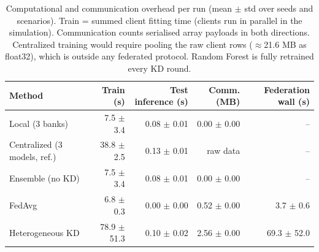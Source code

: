 \begin{table}[t]
\centering
\scriptsize
\caption{Computational and communication overhead per run (mean $\pm$ std over seeds and scenarios). Train = summed client fitting time (clients run in parallel in the simulation). Communication counts serialised array payloads in both directions. Centralized training would require pooling the raw client rows ($\approx$21.6 MB as float32), which is outside any federated protocol. Random Forest is fully retrained every KD round.}
\label{tab:cost}
\begin{tabular}{lrrrr}
\toprule
Method & Train (s) & Test inference (s) & Comm. (MB) & Federation wall (s) \\
\midrule
Local (3 banks) & 7.5 $\pm$ 3.4 & 0.08 $\pm$ 0.01 & 0.00 $\pm$ 0.00 & -- \\
Centralized (3 models, ref.) & 38.8 $\pm$ 2.5 & 0.13 $\pm$ 0.01 & raw data & -- \\
Ensemble (no KD) & 7.5 $\pm$ 3.4 & 0.08 $\pm$ 0.01 & 0.00 $\pm$ 0.00 & -- \\
FedAvg & 6.8 $\pm$ 0.3 & 0.00 $\pm$ 0.00 & 0.52 $\pm$ 0.00 & 3.7 $\pm$ 0.6 \\
Heterogeneous KD & 78.9 $\pm$ 51.3 & 0.10 $\pm$ 0.02 & 2.56 $\pm$ 0.00 & 69.3 $\pm$ 52.0 \\
\bottomrule
\end{tabular}
\end{table}
